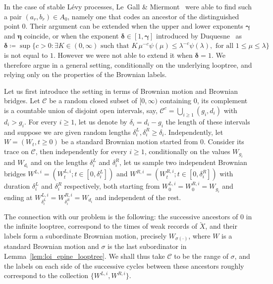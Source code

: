 \documentclass[british, a4paper,11pt]{article}
\numberwithin{equation}{section}
\theoremstyle{definition}
\newcommand{\bddelta}{\boldsymbol{\delta}}
\newcommand{\bdgamma}{\boldsymbol{\gamma}}
\newcommand{\bdeta}{\boldsymbol{\eta}}
\begin{document}
In the case of stable L\'evy processes, Le~Gall \& Miermont~\cite[Lemma~15]{LGM11} were able to find such a pair $(a_r, b_r) \in A_0$, namely one that codes an ancestor of the distinguished point $0$. Their argument can be extended when the upper and lower exponents $\bdgamma$ and $\bdeta$ coincide, or when the exponent $\bddelta \in [1, \bdgamma]$ introduced by Duquesne~\cite{Duq12} as $\bddelta \coloneqq \sup\{c > 0 \colon \exists K \in (0, \infty) \text{ such that } K\, \mu^{-c} \psi(\mu) \leq \lambda^{-c} \psi(\lambda), \text{ for all } 1 \leq \mu \leq \lambda\}$ is not equal to $1$.
However we were not able to extend it when $\bddelta=1$.
We therefore argue in a general setting, conditionally on the underlying looptree, and relying only on the properties of the Brownian labels.


Let us first introduce the setting in terms of Brownian motion and Brownian bridges. Let $\mathcal{C}$ be a random closed subset of $[0,\infty)$ containing $0$, its complement is a countable union of disjoint open intervals, say, $\mathcal{C}^c = \bigcup_{i \geq 1} (g_i, d_i)$ with $d_i > g_i$.
For every $i \geq 1$, let us denote by $\delta_i = d_i-g_i$ the length of these intervals and suppose we are given random lengths $\delta^L_i, \delta^R_i \geq \delta_i$.
Independently, let $W = (W_t , t \geq 0)$ be a standard Brownian motion started from $0$. Consider its trace on $\mathcal{C}$, then independently for every $i \geq 1$, conditionally on the values $W_{g_i}$ and $W_{d_i}$ and on the lengths $\delta^L_i$ and $\delta^R_i$, let us sample two independent Brownian bridges $W^{L,i} = (W^{L,i}_t ; t \in [0, \delta^L_i])$ and $W^{R,i} = (W^{R,i}_t ; t \in [0, \delta^R_i])$ with duration $\delta^L_i$ and $\delta^R_i$ respectively, both starting from $W^{L,i}_0 = W^{R,i}_0 = W_{g_i}$ and ending at $W^{L,i}_{\delta^L_i} = W^{R,i}_{\delta^R_i} = W_{d_i}$ and independent of the rest.


The connection with our problem is the following: the successive ancestors of $0$ in the infinite looptree, correspond to the times of weak records of $\overleftarrow{X}$, and their labels form a subordinate Brownian motion, precisely $W_{\sigma(\cdot)}$, where $W$ is a standard Brownian motion and $\sigma$ is the last subordinator in Lemma~\ref{lem:loi_epine_looptree}. We shall thus take $\mathcal{C}$ to be the range of $\sigma$, and the labels on each side of the successive cycles between these ancestors roughly correspond to the collection $\{W^{L,i},W^{R,i}\}$.
\end{document}
